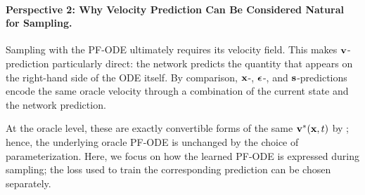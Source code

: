 



\paragraph{Perspective 2: Why Velocity Prediction Can Be Considered Natural for Sampling.}

Sampling with the PF-ODE ultimately requires its velocity field.
This makes ${\mathbf{v}}$-prediction particularly direct: the network predicts the
quantity that appears on the right-hand side of the ODE itself. By comparison,
${\mathbf{x}}$-, ${\bm{\epsilon}}$-, and ${\mathbf{s}}$-predictions encode the same oracle velocity
through a combination of the current state and the network prediction.

At the oracle level, these are exactly convertible forms of the same
${\mathbf{v}}^*({\mathbf{x}},t)$ by ; hence, the underlying oracle
PF-ODE is unchanged by the choice of parameterization. Here, we focus on how
the learned PF-ODE is expressed during sampling; the loss used to train the
corresponding prediction can be chosen separately.

